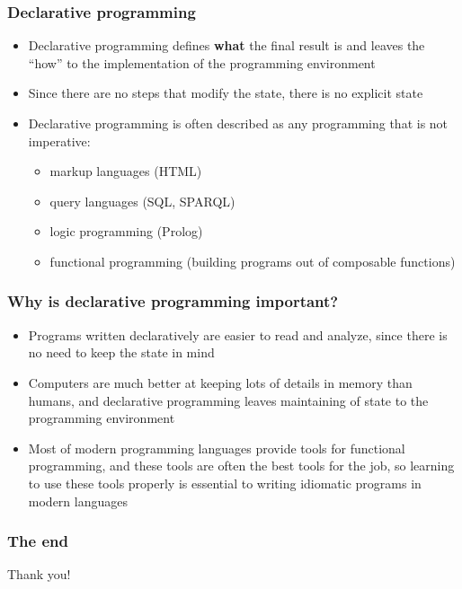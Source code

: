 \documentclass{beamer}
\begin{document}
\begin{frame}
  \frametitle{Declarative programming}
  \begin{itemize}
  \item Declarative programming defines \textbf{what} the final result is and
    leaves the ``how'' to the implementation of the programming environment
  \item Since there are no steps that modify the state, there is no explicit
    state                       
  \item Declarative programming is often described as any programming that is
    not imperative:
    \begin{itemize}
    \item markup languages (HTML)
    \item query languages (SQL, SPARQL)
    \item logic programming (Prolog)
    \item functional programming (building programs out of composable functions)
    \end{itemize}
  \end{itemize}
\end{frame}

\begin{frame}
  \frametitle{Why is declarative programming important?}
  \begin{itemize}
  \item Programs written declaratively are easier to read and analyze, since
    there is no need to keep the state in mind
  \item Computers are much better at keeping lots of details in memory than
    humans, and declarative programming leaves maintaining of state to the
    programming environment
  \item Most of modern programming languages provide tools for functional
    programming, and these tools are often the best tools for the job, so
    learning to use these tools properly is essential to writing idiomatic
    programs in modern languages
  \end{itemize}
\end{frame}

\begin{frame}
  \frametitle{The end}
  \begin{center}
    Thank you!
  \end{center}
\end{frame}
\end{document}
